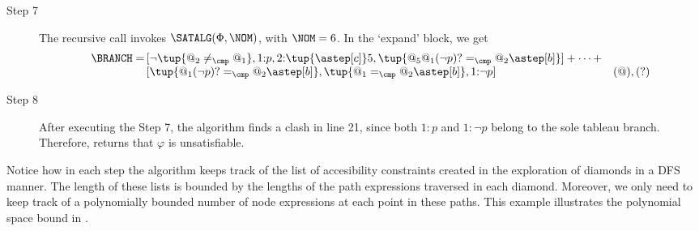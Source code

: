 \begin{exa}
\begin{description}
  \item[Step 7] 
    The recursive call invokes $\SATALG(\Phi,\NOM)$, with $\NOM=6$. In the `expand' block, we get 
    \[
      \begin{array}{r@{\,}@{}lr}
        \BRANCH = 
            &
            [
              \neg\tup{@_2\neq_{\cmp}@_1}, 1{:}p, 2{:}\tup{\astep[c]}5, \tup{@_5@_1(\neg p)? =_\cmp @_2\astep[b]}
            ] + \dots + \\
            &
            [
              \tup{@_1(\neg p)? =_{\cmp} @_2\astep[b]}, \tup{@_1 =_{\cmp}@_2\astep[b]}, 1{:}\neg p
            ] 
              & (@), (?) 
      \end{array}
    \]
    \item[Step 8] 
      After executing the Step 7, the algorithm finds a clash in line 21, since both $1{:}p$ and $1{:}\neg p$ belong to the sole tableau branch. Therefore,  returns that $\varphi$ is unsatisfiable.
\end{description}

Notice how in each step the algorithm keeps track of the list of accesibility constraints created in the exploration of diamonds in a DFS manner.
The length of these lists is bounded by the lengths of the path expressions traversed in each diamond.
Moreover, we only need to keep track of a polynomially bounded number of node expressions at each point in these paths.
This example illustrates the polynomial space bound in .
\end{exa}